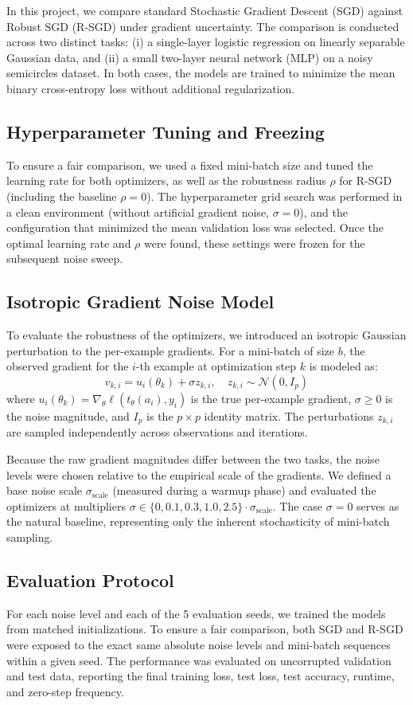 In this project, we compare standard Stochastic Gradient Descent (SGD) against Robust SGD (R-SGD) under gradient uncertainty. The comparison is conducted across two distinct tasks: (i) a single-layer logistic regression on linearly separable Gaussian data, and (ii) a small two-layer neural network (MLP) on a noisy semicircles dataset. In both cases, the models are trained to minimize the mean binary cross-entropy loss without additional regularization.

\subsection{Hyperparameter Tuning and Freezing}
To ensure a fair comparison, we used a fixed mini-batch size and 
tuned the learning rate for both optimizers, as well as the robustness 
radius \(\rho\) for R-SGD (including the baseline \(\rho=0\)). 
The hyperparameter grid search was performed in a clean environment 
(without artificial gradient noise, \(\sigma=0\)), and the configuration 
that minimized the mean validation loss was selected. Once the optimal 
learning rate and \(\rho\) were found, these settings were 
frozen for the subsequent noise sweep. 

\subsection{Isotropic Gradient Noise Model}
To evaluate the robustness of the optimizers, we introduced an isotropic 
Gaussian perturbation to the per-example gradients. For a mini-batch of 
size \(b\), the observed gradient for the \(i\)-th example at optimization 
step \(k\) is modeled as:
\begin{equation}
    v_{k,i} = u_i(\theta_k) + \sigma z_{k,i}, \quad z_{k,i} \sim \mathcal{N}(0, I_p)
\end{equation}
where \(u_i(\theta_k) = \nabla_\theta \ell(t_\theta(a_i), y_i)\) is the true per-example gradient, \(\sigma \ge 0\) is the noise magnitude, and \(I_p\) is the \(p \times p\) identity matrix. The perturbations \(z_{k,i}\) are sampled independently across observations and iterations. 

Because the raw gradient magnitudes differ between the two tasks, the noise levels were chosen relative to the empirical scale of the gradients. We defined a base noise scale \(\sigma_{\text{scale}}\) (measured during a warmup phase) and evaluated the optimizers at multipliers \(\sigma \in \{0, 0.1, 0.3, 1.0, 2.5\} \cdot \sigma_{\text{scale}}\). The case \(\sigma=0\) serves as the natural baseline, representing only the inherent stochasticity of mini-batch sampling. 

\subsection{Evaluation Protocol}
For each noise level and each of the 5 evaluation seeds, we trained the models from matched initializations. To ensure a fair comparison, both SGD and R-SGD were exposed to the exact same absolute noise levels and mini-batch sequences within a given seed. The performance was evaluated on uncorrupted validation and test data, reporting the final training loss, test loss, test accuracy, runtime, and zero-step frequency.
